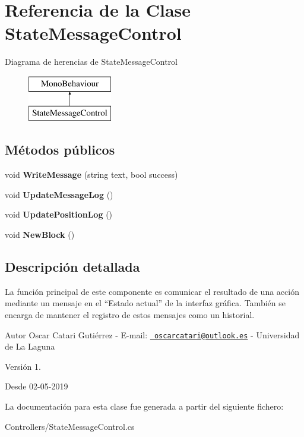 \hypertarget{class_state_message_control}{}\section{Referencia de la Clase State\+Message\+Control}
\label{class_state_message_control}
Diagrama de herencias de State\+Message\+Control\begin{figure}[H]
\begin{center}
\leavevmode
\includegraphics[height=2.000000cm]{class_state_message_control}
\end{center}
\end{figure}
\subsection*{Métodos públicos}
\begin{DoxyCompactItemize}
\item 
\mbox{\label{class_state_message_control_a0b0830fc3f8fe9d578fce4b3d944cde6}} 
void {\bfseries Write\+Message} (string text, bool success)
\item 
\mbox{\label{class_state_message_control_af56933aa9a5a8d7d2c1e5fd515ec65e8}} 
void {\bfseries Update\+Message\+Log} ()
\item 
\mbox{\label{class_state_message_control_aeace074591852cb0cc7125520bc49817}} 
void {\bfseries Update\+Position\+Log} ()
\item 
\mbox{\label{class_state_message_control_a534610a9734b552696484aaeeb83c8b7}} 
void {\bfseries New\+Block} ()
\end{DoxyCompactItemize}


\subsection{Descripción detallada}
La función principal de este componente es comunicar el resultado de una acción mediante un mensaje en el “\+Estado actual” de la interfaz gráfica. También se encarga de mantener el registro de estos mensajes como un historial. \begin{DoxyAuthor}{Autor}
Oscar Catari Gutiérrez -\/ E-\/mail\+: \href{mailto:oscarcatari@outlook.es}{\texttt{ oscarcatari@outlook.\+es}} -\/ Universidad de La Laguna 
\end{DoxyAuthor}
\begin{DoxyVersion}{Versión}
1. 
\end{DoxyVersion}
\begin{DoxySince}{Desde}
02-\/05-\/2019 
\end{DoxySince}


La documentación para esta clase fue generada a partir del siguiente fichero\+:\begin{DoxyCompactItemize}
\item 
Controllers/State\+Message\+Control.\+cs\end{DoxyCompactItemize}
